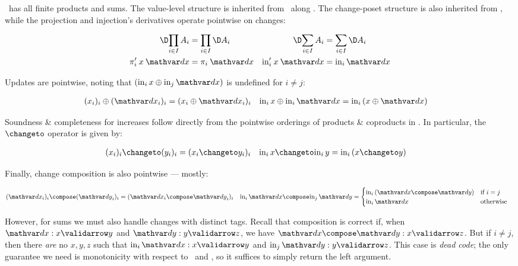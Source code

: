 
\CP\ has all finite products and sums. The value-level structure is inherited
from \Poset\ along \valfn. The change-poset structure is also inherited from
\Poset, while the projection and injection's derivatives operate pointwise on
changes:

\nopagebreak[2]
\begin{align*}
  \chgs{\prod_{i \in I} A_i} &= \prod_{i \in I} \chgs A_i &
  \chgs{\sum_{i \in I} A_i} &= \sum_{i \in I} \chgs A_i
  \\
  \deriv\pi_i\<x\<\dx &= \pi_i\<\dx & \deriv\injc_i\<x\<\dx &= \inj i \dx
\end{align*}

\noindent {}

\noindent Updates are pointwise, noting that $(\inj i x \upd \inj j \dx)$ is
undefined for $i \ne j$:

\nopagebreak[2]
\begin{align*}
  (x_i)_i \upd (\dx_i)_i &= (x_i \upd \dx_i)_i &
  \inj i x \upd \inj i \dx &= \inj i (x \upd \dx)
\end{align*}

\noindent
Soundness \& completeness for increases follow directly from the pointwise
orderings of products \& coproducts in \Poset{}. In particular, the $\changetofn$
operator is given by:

\nopagebreak[2]
\begin{align*}
  (x_i)_i \changeto (y_i)_i &= (x_i \changeto y_i)_i &
  \inj i x \changeto \inj i y &= \inj i (x \changeto y)
\end{align*}

\noindent Finally, change composition is also pointwise --- mostly:

\nopagebreak[2]
\begin{align*}
  (\dx_i)_i \compose (\dy_i)_i &= (\dx_i \compose \dy_i)_i &
  \inj i \dx \compose \inj j \dy &=
  \begin{cases}
    \inj i (\dx \compose \dy) &\text{if}~i=j\\
    \inj i \dx &\text{otherwise}
  \end{cases}
\end{align*}

\noindent
However, for sums we must also handle changes with distinct tags. Recall that
composition is correct if, when $\valid\dx x y$ and $\valid\dy y z$, we have
$\valid{\dx\compose\dy} x z$. But if $i \ne j$, then
%
there \emph{are} no $x,y,z$ such that $\valid{\inj i \dx} x y$ and $\valid{\inj j \dy} y z$.
%
This case is \emph{dead code}; the only guarantee we need is monotonicity with
respect to \dx\ and \dy, so it suffices to simply return the left argument.

